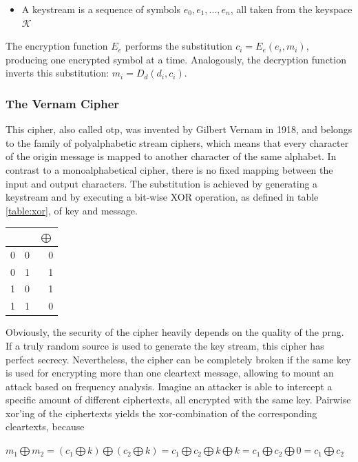 \begin{itemize}
 \item A keystream is a sequence of symbols $e_0, e_1, ..., e_n$, all taken from the keyspace $\mathcal{K}$
\end{itemize}

The encryption function $E_e$ performs the substitution $c_i = E_e(e_i, m_i)$, producing one encrypted symbol at a time. Analogously,
the decryption function inverts this substitution: $m_i = D_d(d_i, c_i)$.

\subsubsection{The Vernam Cipher} 

This cipher, also called \gls{otp}, was invented by Gilbert Vernam in 1918, and belongs to the family of polyalphabetic stream ciphers,
which means that every character of the origin message is mapped to another character of the same alphabet. In contrast to a monoalphabetical cipher,
there is no fixed mapping between the input and output characters.
The substitution is achieved by generating a keystream and by executing 
a bit-wise XOR operation, as defined in table \ref{table:xor}, of key and message.

\begin{center}
\begin{tabular}{ l c | r }
 \label{table:xor}
   &  & $\bigoplus$ \\ \hline
  0 & 0 & 0 \\
  0 & 1 & 1 \\
  1 & 0 & 1 \\
  1 & 1 & 0 \\
\end{tabular}
\end{center}

Obviously, the security of the cipher heavily depends on the quality of the \gls{prng}. If a truly random source is used to generate the key stream, this cipher
has perfect secrecy. Nevertheless, the cipher can be completely broken if the same key is used for encrypting more than one cleartext message, allowing to mount
an attack based on frequency analysis.
Imagine an attacker is able to intercept a specific amount of different ciphertexts, all encrypted with the same key. Pairwise xor'ing of the ciphertexts
yields the xor-combination of the corresponding cleartexts, because
\begin{center}
 $m_1 \bigoplus m_2 = (c_1 \bigoplus k) \bigoplus (c_2 \bigoplus k) = c_1 \bigoplus c_2 \bigoplus k \bigoplus k = c_1 \bigoplus c_2 \bigoplus 0 = c_1 \bigoplus c_2$
\end{center}


